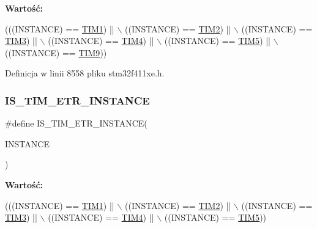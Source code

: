 {\bfseries Wartość\+:}
\begin{DoxyCode}
(((INSTANCE) == \hyperlink{group___peripheral__declaration_ga2e87451fea8dc9380056d3cfc5ed81fb}{TIM1}) || \(\backslash\)
                                                      ((INSTANCE) == \hyperlink{group___peripheral__declaration_ga3cfac9f2e43673f790f8668d48b4b92b}{TIM2}) || \(\backslash\)
                                                      ((INSTANCE) == \hyperlink{group___peripheral__declaration_ga61ee4c391385607d7af432b63905fcc9}{TIM3}) || \(\backslash\)
                                                      ((INSTANCE) == \hyperlink{group___peripheral__declaration_ga91a09bad8bdc7a1cb3d85cf49c94c8ec}{TIM4}) || \(\backslash\)
                                                      ((INSTANCE) == \hyperlink{group___peripheral__declaration_ga5125ff6a23a2ed66e2e19bd196128c14}{TIM5}) || \(\backslash\)
                                                      ((INSTANCE) == \hyperlink{group___peripheral__declaration_gaf52b4b4c36110a0addfa98059f54a50e}{TIM9}))
\end{DoxyCode}


Definicja w linii 8558 pliku stm32f411xe.\+h.

\mbox{\label{group___exported__macros_gac71942c3817f1a893ef84fefe69496b7}} 
\subsubsection{\texorpdfstring{I\+S\+\_\+\+T\+I\+M\+\_\+\+E\+T\+R\+\_\+\+I\+N\+S\+T\+A\+N\+CE}{IS\_TIM\_ETR\_INSTANCE}}
{\footnotesize\ttfamily \#define I\+S\+\_\+\+T\+I\+M\+\_\+\+E\+T\+R\+\_\+\+I\+N\+S\+T\+A\+N\+CE(\begin{DoxyParamCaption}\item[{}]{I\+N\+S\+T\+A\+N\+CE }\end{DoxyParamCaption})}

{\bfseries Wartość\+:}
\begin{DoxyCode}
(((INSTANCE) == \hyperlink{group___peripheral__declaration_ga2e87451fea8dc9380056d3cfc5ed81fb}{TIM1}) || \(\backslash\)
                                        ((INSTANCE) == \hyperlink{group___peripheral__declaration_ga3cfac9f2e43673f790f8668d48b4b92b}{TIM2}) || \(\backslash\)
                                        ((INSTANCE) == \hyperlink{group___peripheral__declaration_ga61ee4c391385607d7af432b63905fcc9}{TIM3}) || \(\backslash\)
                                        ((INSTANCE) == \hyperlink{group___peripheral__declaration_ga91a09bad8bdc7a1cb3d85cf49c94c8ec}{TIM4}) || \(\backslash\)
                                        ((INSTANCE) == \hyperlink{group___peripheral__declaration_ga5125ff6a23a2ed66e2e19bd196128c14}{TIM5}))
\end{DoxyCode}


